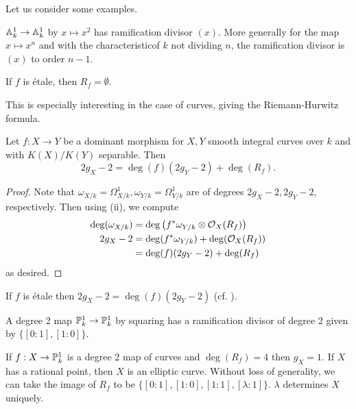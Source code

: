 Let us consider some examples. 
\begin{example}
    $\mathbb{A}^{1}_{k}\to\mathbb{A}^{1}_{k}$ by $x\mapsto x^{2}$ has ramification divisor $(x)$. More generally for the map $x\mapsto x^{n}$ and with the characteristicof $k$ not dividing $n$, the ramification divisor is $(x)$ to order $n-1$. 
\end{example}
\begin{example}\label{ex: etale map has empty ramification divisor}
    If $f$ is \'{e}tale, then $R_{f}=\emptyset$. 
\end{example}
This is especially interesting in the case of curves, giving the Riemann-Hurwitz formula. 
\begin{proposition}\label{prop: Riemann-Hurwitz}
    Let $f:X\to Y$ be a dominant morphism for $X,Y$ smooth integral curves over $k$ and with $K(X)/K(Y)$ separable. Then 
    $$2g_{X}-2=\deg(f)(2g_{Y}-2)+\deg(R_{f}).$$
\end{proposition}
\begin{proof}
    Note that $\omega_{X/k}=\Omega^{1}_{X/k},\omega_{Y/k}=\Omega^{1}_{Y/k}$ are of degrees $2g_{X}-2,2g_{Y}-2$, respectively. Then using  (ii), we compute 
    \begin{align*}
        \deg(\omega_{X/k}) &= \deg\left(f^{*}\omega_{Y/k}\otimes\mathcal{O}_{X}(R_{f})\right) \\
        2g_{X}-2 &= \deg(f^{*}\omega_{Y/k})+\deg(\mathcal{O}_{X}(R_{f})) \\
        &= \deg(f)(2g_{Y}-2)+\deg(R_{f})
    \end{align*}
    as desired. 
\end{proof}
\begin{example}
    If $f$ is \'{e}tale then $2g_{X}-2=\deg(f)(2g_{Y}-2)$ (cf. ). 
\end{example}
\begin{example}
    A degree 2 map $\mathbb{P}^{1}_{k}\to\mathbb{P}^{1}_{k}$ by squaring has a ramification divisor of degree 2 given by $\{[0:1],[1:0]\}$. 
\end{example}
\begin{example}
    If $f:X\to\mathbb{P}^{1}_{k}$ is a degree 2 map of curves and $\deg(R_{f})=4$ then $g_{X}=1$. If $X$ has a rational point, then $X$ is an elliptic curve. Without loss of generality, we can take the image of $R_{f}$ to be $\{[0:1],[1:0],[1:1],[\lambda:1]\}$. $\lambda$ determines $X$ uniquely. 
\end{example}
